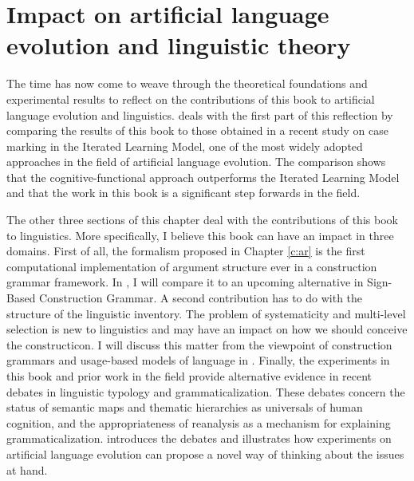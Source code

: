 
\setcounter{chapter}{4}
\chapter{Impact on artificial language evolution and linguistic theory}
\label{c:impact}
\label{c:impact-linguistics}
The time has now come to weave through the theoretical foundations and experimental results to reflect on the contributions of this book to artificial language evolution and linguistics.  deals with the first part of this reflection by comparing the results of this book to those obtained in a recent study on case marking in the Iterated Learning Model, one of the most widely adopted approaches in the field of artificial language evolution. The comparison shows that the cognitive-functional approach outperforms the Iterated Learning Model and that the work in this book is a significant step forwards in the field.

The other three sections of this chapter deal with the contributions of this book to linguistics. More specifically, I believe this book can have an impact in three domains. First of all, the formalism proposed in Chapter \ref{c:ar} is the first computational implementation of argument structure ever in a construction grammar framework. In , I will compare it to an upcoming alternative in Sign-Based Construction Grammar. A second contribution has to do with the structure of the linguistic inventory. The problem of systematicity and multi-level selection is new to linguistics and may have an impact on how we should conceive the constructicon. I will discuss this matter from the viewpoint of construction grammars and usage-based models of language in . Finally, the experiments in this book and prior work in the field provide alternative evidence in recent debates in linguistic typology and grammaticalization. These debates concern the status of semantic maps and thematic hierarchies as universals of human cognition, and the appropriateness of reanalysis as a mechanism for explaining grammaticalization.  introduces the debates and illustrates how experiments on artificial language evolution can propose a novel way of thinking about the issues at hand.

